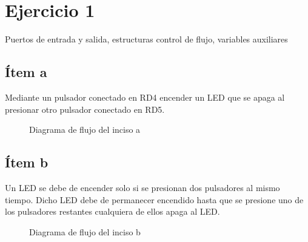 \documentclass[12pt,a4paper]{article}
\begin{document}
\newpage
{} %

\tableofcontents{} %

\listoffigures %

\listoftables %

\newpage
{}
\section*{Ejercicio 1} 
Puertos de entrada y salida, estructuras control de flujo, variables auxiliares

\subsection*{Ítem a} Mediante un pulsador conectado en RD4 encender un LED que se apaga al presionar otro
pulsador conectado en RD5.



\begin{figure} [H] %
	\centering
\caption{Diagrama de flujo del inciso a}
\label{fig:inciso_a}
\end{figure}



\begin{pyglist}[caption={nombre del programa.c}] 
\end{pyglist}
	
\subsection*{Ítem b} Un LED se debe de encender solo si se presionan dos pulsadores al mismo tiempo. Dicho
LED debe de permanecer encendido hasta que se presione uno de los pulsadores restantes
cualquiera de ellos apaga al LED.



\begin{figure} [H] %
	\centering
	\caption{Diagrama de flujo del inciso b}
	\label{fig:inciso_b}
\end{figure}
\end{document}

